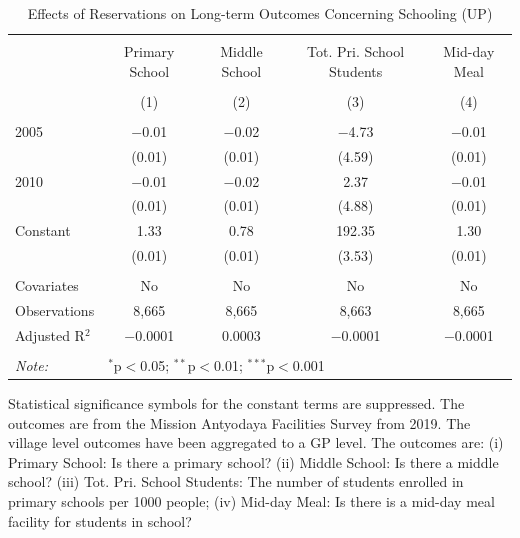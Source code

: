 \begin{table}[!htbp]
\centering
\begin{threeparttable}

  \caption{Effects of Reservations on Long-term Outcomes Concerning Schooling (UP)} 
  \label{up_shrug_schooling_05_10} 
\scriptsize 
\begin{tabular}{@{\extracolsep{0pt}}lcccc} 
\\[-1.8ex]\hline 
\hline \\[-1.8ex] 
 & Primary School & Middle School & Tot. Pri. School Students & Mid-day Meal \\ 
\\[-1.8ex] & (1) & (2) & (3) & (4)\\ 
\hline \\[-1.8ex] 
 2005 & $-$0.01 & $-$0.02 & $-$4.73 & $-$0.01 \\ 
  & (0.01) & (0.01) & (4.59) & (0.01) \\ 
  2010 & $-$0.01 & $-$0.02 & 2.37 & $-$0.01 \\ 
  & (0.01) & (0.01) & (4.88) & (0.01) \\ 
  Constant & 1.33 & 0.78 & 192.35 & 1.30 \\ 
  & (0.01) & (0.01) & (3.53) & (0.01) \\ 
 \hline \\[-1.8ex] 
Covariates & No & No & No & No \\ 
Observations & 8,665 & 8,665 & 8,663 & 8,665 \\ 
Adjusted R$^{2}$ & $-$0.0001 & 0.0003 & $-$0.0001 & $-$0.0001 \\ 
\hline 
\hline \\[-1.8ex] 
\textit{Note:}  & \multicolumn{4}{l}{$^{*}$p$<$0.05; $^{**}$p$<$0.01; $^{***}$p$<$0.001} \\ 
\end{tabular} 
\begin{tablenotes}[flushleft]
\scriptsize
\item[] Statistical significance symbols for the constant terms are suppressed. The outcomes are from the Mission Antyodaya Facilities Survey from 2019.
                     The village level outcomes have been aggregated to a GP level.
                     The outcomes are:
                         (i) Primary School: Is there a primary school?
                         (ii) Middle School: Is there a middle school?
                         (iii) Tot. Pri. School Students: The number of students enrolled in primary schools per 1000 people;
                         (iv) Mid-day Meal: Is there is a mid-day meal facility for students in school?
\end{tablenotes}
\end{threeparttable}
\end{table}

